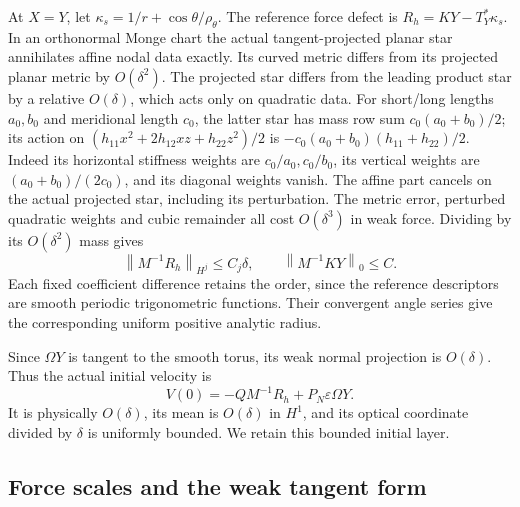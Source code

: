 \documentclass[11pt,a4paper]{article}
\numberwithin{equation}{section}
\theoremstyle{remark}
\newcommand{\norm}[1]{\left\lVert #1\right\rVert}
\newcommand{\PN}{P_{\!N}}
\begin{document}
At \(X=Y\), let \(\kappa_s=1/r+\cos\theta/\rho_\theta\).
The reference force defect is
\(R_h=KY-T_Y^*\kappa_s\). In an orthonormal Monge chart the actual
tangent-projected planar star annihilates affine nodal data exactly.
Its curved metric differs from its projected planar metric by
\(O(\delta^2)\). The projected star differs from the leading product
star by a relative \(O(\delta)\), which acts only on quadratic data.
For short/long lengths \(a_0,b_0\) and meridional length \(c_0\),
the latter star has mass row sum \(c_0(a_0+b_0)/2\); its action on
\((h_{11}x^2+2h_{12}xz+h_{22}z^2)/2\) is
\(-c_0(a_0+b_0)(h_{11}+h_{22})/2\).
Indeed its horizontal stiffness weights are \(c_0/a_0,c_0/b_0\),
its vertical weights are \((a_0+b_0)/(2c_0)\), and its diagonal
weights vanish. The affine part cancels on the actual projected
star, including its perturbation. The metric error, perturbed
quadratic weights and cubic remainder all cost \(O(\delta^3)\)
in weak force. Dividing by its \(O(\delta^2)\) mass gives
\begin{equation}\label{eq:initial-consistency}
 \norm{M^{-1}R_h}_{H^j}\leq C_j\delta,\qquad
 \norm{M^{-1}KY}_0\leq C .
\end{equation}
Each fixed coefficient difference retains the order, since the
reference descriptors are smooth periodic trigonometric functions.
Their convergent angle series give the corresponding uniform
positive analytic radius.

Since \(\Omega Y\) is tangent to the smooth torus, its weak normal
projection is \(O(\delta)\). Thus the actual initial velocity is
\[
 V(0)=-QM^{-1}R_h+\PN\varepsilon\Omega Y .
\]
It is physically \(O(\delta)\), its mean is \(O(\delta)\) in \(H^1\),
and its optical coordinate divided by \(\delta\) is uniformly bounded.
We retain this bounded initial layer.

\subsection{Force scales and the weak tangent form}
\end{document}
